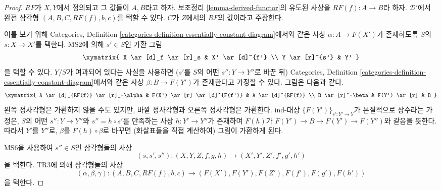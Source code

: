 \begin{proof}
$RF$가 $X, Y$에서 정의되고 그 값들이 $A, B$라고 하자. 보조정리
\ref{lemma-derived-functor}의 유도된 사상을
$RF(f) : A \to B$라 하자. $\mathcal{D}'$에서 완전 삼각형
$(A, B, C, RF(f), b, c)$를 택할 수 있다. $C$가 $Z$에서의
$RF$의 값이라고 주장한다.

\medskip\noindent
이를 보기 위해 Categories, Definition
\ref{categories-definition-essentially-constant-diagram}에서와 같은
사상 $\alpha : A \to F(X')$가 존재하도록 $S$의
$s : X \to X'$를 택한다. MS2에 의해 $s' \in S$인 가환 그림
$$
\xymatrix{
X \ar[d]_f \ar[r]_s & X' \ar[d]^{f'} \\
Y \ar[r]^{s'} & Y'
}
$$
을 택할 수 있다. $Y/S$가 여과되어 있다는 사실을 사용하면
($s'$를 $S$의 어떤 $s'' : Y \to Y''$로 바꾼 뒤)
Categories, Definition \ref{categories-definition-essentially-constant-diagram}에서와
같은 사상 $\beta : B \to F(Y')$가 존재한다고 가정할 수 있다.
그림은 다음과 같다.
$$
\xymatrix{
A \ar[d]_{RF(f)} \ar[r]_-\alpha &
F(X') \ar[r] \ar[d]^{F(f')} &
A \ar[d]^{RF(f)} \\
B \ar[r]^-\beta & F(Y') \ar[r] & B
}
$$
왼쪽 정사각형은 가환하지 않을 수도 있지만, 바깥 정사각형과 오른쪽
정사각형은 가환한다.
ind-대상 $\{F(Y')\}_{s' : Y' \to Y}$가
본질적으로 상수라는 가정은, $S$의 어떤 $s'' : Y \to Y''$와
$s'' = h \circ s'$를 만족하는 사상 $h : Y' \to Y''$가 존재하며
$F(h)$가 $F(Y') \to B \to F(Y') \to F(Y'')$와 같음을 뜻한다.
따라서 $Y'$를 $Y''$로, $\beta$를 $F(h) \circ \beta$로 바꾸면
(화살표들을 직접 계산하여) 그림이 가환하게 된다.

\medskip\noindent
MS6을 사용하여 $s'' \in S$인 삼각형들의 사상
$$
(s, s', s'') : (X, Y, Z, f, g, h) \longrightarrow (X', Y', Z', f', g', h')
$$
을 택한다. TR3에 의해 삼각형들의 사상
$$
(\alpha, \beta, \gamma) :
(A, B, C, RF(f), b, c)
\longrightarrow
(F(X'), F(Y'), F(Z'), F(f'), F(g'), F(h'))
$$
을 택한다.


\end{proof}
